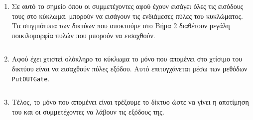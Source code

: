 \begin{enumerate}
    \begin{longlisting}
        \begin{center}
            \inputminted[fontsize=\scriptsize,frame=single]{cpp}{./01_body/code/aby-example-step-3.cpp}
        \end{center}
    \end{longlisting}
    Είναι σχεδόν προφανές ότι ο παραπάνω κώδικας μπορεί να βελτιωθεί θεωρώντας μια συνάρτηση και περνώντας σαν ορίσματα σε αυτή τα \texttt{N, X, incX} και \texttt{N, Y, incX}, ωστόσο για να μη γίνει δυσανάγνωστη η εργασία προτιμήσαμε την πιο απλή του μορφή\footnote{Βελτιστοποιήσεις όπως αυτή, αξιοποιούνται μαζικά στον κώδικα της MPC-BLAS, που θα εξετάσουμε στη συνέχεια, καθώς παρατηρήθηκε πως κατά την υλοποίηση της υπάρχει μεγάλη επαναληψημότητα αλγοριθμικής λογικής.}.
    \item Σε αυτό το σημείο όπου οι συμμετέχοντες αφού έχουν εισάγει όλες τις εισόδους τους στο κύκλωμα, μπορούν να εισάγουν τις ενδιάμεσες πύλες του κυκλώματος. Τα στιγμιότυπα των δικτύων που αποκτούμε στο Βήμα 2 διαθέτουν μεγάλη ποικιλομορφία πυλών που μπορούν να εισαχθούν.
    \begin{longlisting}
        \begin{center}
            \inputminted[fontsize=\scriptsize,frame=single]{cpp}{./01_body/code/aby-example-step-4.cpp}
        \end{center}
    \end{longlisting}
    \item Αφού έχει χτιστεί ολόκληρο το κύκλωμα το μόνο που απομένει στο χτίσιμο του δικτύου είναι να εισαχθούν πύλες εξόδου. Αυτό επιτυγχάνεται μέσω των μεθόδων \texttt{PutOUTGate}.
    \begin{longlisting}
        \begin{center}
            \inputminted[fontsize=\scriptsize,frame=single]{cpp}{./01_body/code/aby-example-step-5.cpp}
        \end{center}
    \end{longlisting}
    \item Τέλος, το μόνο που απομένει είναι τρέξουμε το δίκτυο ώστε να γίνει η αποτίμηση του και οι συμμετέχοντες να λάβουν τις εξόδους της.
    \begin{longlisting}
        \begin{center}
            \inputminted[fontsize=\scriptsize,frame=single]{cpp}{./01_body/code/aby-example-step-6.cpp}
        \end{center}
    \end{longlisting}
\end{enumerate}

